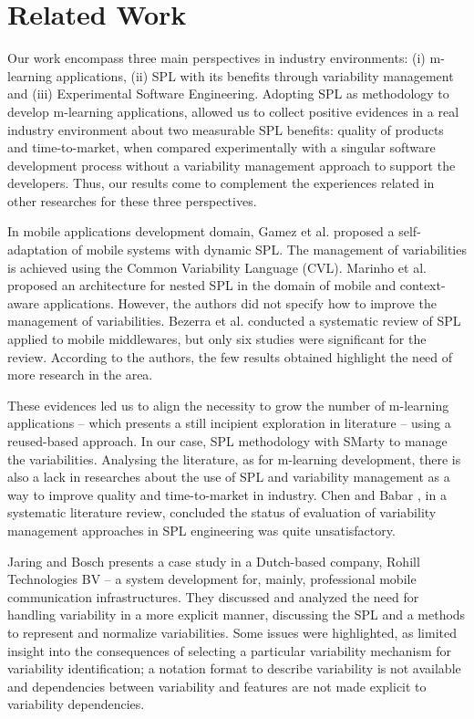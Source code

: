 \section{Related Work} \label{section6}

Our work encompass three main perspectives in industry environments: (i) m-learning applications, (ii) SPL with its benefits through variability management and (iii) Experimental Software Engineering. Adopting SPL as methodology to develop m-learning applications, allowed us to collect positive evidences in a real industry environment about two measurable SPL benefits: quality of products and time-to-market, when compared experimentally with a singular software development process without a variability management approach to support the developers. Thus, our results come to complement the experiences related in other researches for these three perspectives.

In mobile applications development domain, Gamez et al. \cite{gamez14} proposed a self-adaptation of mobile systems with dynamic SPL. The management of variabilities is achieved using the Common Variability Language (CVL). Marinho et al. \cite{marinho10} proposed an architecture for nested SPL in the domain of mobile and context-aware applications. However, the authors did not specify how to improve the management of variabilities. Bezerra et al. \cite{bezerra09} conducted a systematic review of SPL applied to mobile middlewares, but only six studies were significant for the review. According to the authors, the few results obtained highlight the need of more research in the area. 

These evidences led us to align the necessity to grow the number of m-learning applications -- which presents a still incipient exploration in literature -- using a reused-based approach. In our case, SPL methodology with SMarty to manage the variabilities. Analysing the literature, as for m-learning development, there is also a lack in researches about the use of SPL and variability management as a way to improve quality and time-to-market in industry. Chen and Babar \cite{chen11}, in a systematic literature review, concluded the status of evaluation of variability management approaches in SPL engineering was quite unsatisfactory. 

Jaring and Bosch \cite{jaring02} presents a case study in a Dutch-based company, Rohill Technologies BV -- a system development for, mainly, professional mobile communication infrastructures. They discussed and analyzed the need for handling variability in a more explicit manner, discussing the SPL and a methods to represent and normalize variabilities. Some issues were highlighted, as limited insight into the consequences of selecting a particular variability mechanism for variability identification; a notation format to describe variability is not available and dependencies between variability and features are not made explicit to variability dependencies.

